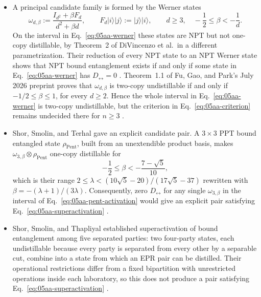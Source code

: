\begin{itemize}
  \item A principal candidate family is formed by the Werner states
\begin{equation}
 \omega_{d,\beta}:=\frac{I_{d^2}+\beta F_d}{d^2+\beta d},
 \qquad
 F_d|i\rangle|j\rangle:=|j\rangle|i\rangle,
 \qquad
 d\geq3,\quad -\frac12\leq\beta<-\frac1d.
 \label{eq:05aa-werner}
\end{equation}
On the interval in Eq.~\eqref{eq:05aa-werner} these states are NPT but not one-copy distillable, by Theorem~2 of DiVincenzo et al.\ in a different parametrization. Their reduction of every NPT state to an NPT Werner state shows that NPT bound entanglement exists if and only if some state in Eq.~\eqref{eq:05aa-werner} has $D_\leftrightarrow=0$ . Theorem~1.1 of Fu, Gao, and Park's July 2026 preprint proves that $\omega_{d,\beta}$ is two-copy undistillable if and only if $-1/2\leq\beta\leq1$, for every $d\geq2$. Hence the whole interval in Eq.~\eqref{eq:05aa-werner} is two-copy undistillable, but the criterion in Eq.~\eqref{eq:05aa-criterion} remains undecided there for $n\geq3$ .

  \item Shor, Smolin, and Terhal gave an explicit candidate pair. A $3\times3$ PPT bound entangled state $\rho_{\mathrm{Pent}}$, built from an unextendible product basis, makes $\omega_{3,\beta}\otimes\rho_{\mathrm{Pent}}$ one-copy distillable for
\begin{equation}
 -\frac12\leq\beta<-\frac{7-\sqrt5}{10},
 \label{eq:05aa-pent-activation}
\end{equation}
which is their range $2\leq\lambda<(10\sqrt5-20)/(17\sqrt5-37)$ rewritten with $\beta=-(\lambda+1)/(3\lambda)$. Consequently, zero $D_\leftrightarrow$ for any single $\omega_{3,\beta}$ in the interval of Eq.~\eqref{eq:05aa-pent-activation} would give an explicit pair satisfying Eq.~\eqref{eq:05aa-superactivation} .

  \item Shor, Smolin, and Thapliyal established superactivation of bound entanglement among five separated parties: two four-party states, each undistillable because every party is separated from every other by a separable cut, combine into a state from which an EPR pair can be distilled. Their operational restrictions differ from a fixed bipartition with unrestricted operations inside each laboratory, so this does not produce a pair satisfying Eq.~\eqref{eq:05aa-superactivation} .
\end{itemize}

